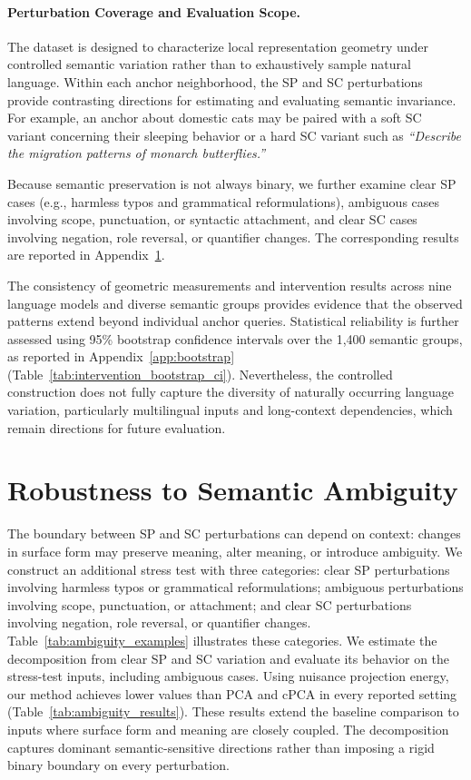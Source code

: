 \paragraph{Perturbation Coverage and Evaluation Scope.}
The dataset is designed to characterize local representation geometry under controlled semantic variation rather than to exhaustively sample natural language. Within each anchor neighborhood, the SP and SC perturbations provide contrasting directions for estimating and evaluating semantic invariance. For example, an anchor about domestic cats may be paired with a soft SC variant concerning their sleeping behavior or a hard SC variant such as \textit{``Describe the migration patterns of monarch butterflies.''}

Because semantic preservation is not always binary, we further examine clear SP cases (e.g., harmless typos and grammatical reformulations), ambiguous cases involving scope, punctuation, or syntactic attachment, and clear SC cases involving negation, role reversal, or quantifier changes. The corresponding results are reported in Appendix~\ref{app:ambiguity}.

The consistency of geometric measurements and intervention results across nine language models and diverse semantic groups provides evidence that the observed patterns extend beyond individual anchor queries. Statistical reliability is further assessed using 95\% bootstrap confidence intervals over the 1,400 semantic groups, as reported in Appendix~\ref{app:bootstrap} (Table~\ref{tab:intervention_bootstrap_ci}). Nevertheless, the controlled construction does not fully capture the diversity of naturally occurring language variation, particularly multilingual inputs and long-context dependencies, which remain directions for future evaluation.



\section{Robustness to Semantic Ambiguity}
\label{app:ambiguity}

The boundary between SP and SC perturbations can depend on context: changes in surface form may preserve meaning, alter meaning, or introduce ambiguity. We construct an additional stress test with three categories: clear SP perturbations involving harmless typos or grammatical reformulations; ambiguous perturbations involving scope, punctuation, or attachment; and clear SC perturbations involving negation, role reversal, or quantifier changes. Table~\ref{tab:ambiguity_examples} illustrates these categories. We estimate the decomposition from clear SP and SC variation and evaluate its behavior on the stress-test inputs, including ambiguous cases. Using nuisance projection energy, our method achieves lower values than PCA and cPCA in every reported setting (Table~\ref{tab:ambiguity_results}). These results extend the baseline comparison to inputs where surface form and meaning are closely coupled. The decomposition captures dominant semantic-sensitive directions rather than imposing a rigid binary boundary on every perturbation.


